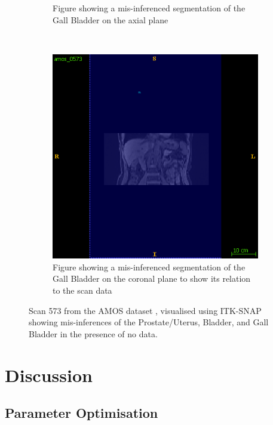 \documentclass{l4proj}
\begin{document}
\begin{figure}[htb]
\begin{subfigure}[b]{0.45\textwidth}
        \caption{Figure showing a mis-inferenced segmentation of the Gall Bladder on the axial plane}
        \label{fig:additional_mis_inference_ghost_2}
    \end{subfigure}
    ~
    \begin{subfigure}[b]{0.45\textwidth}
        \includegraphics[width=\textwidth]{images/ghost_22.png}
        \caption{Figure showing a mis-inferenced segmentation of the Gall Bladder on the coronal plane to show its relation to the scan data}
        \label{fig:additional_mis_inference_ghost_22}
    \end{subfigure}

    \caption{Scan 573 from the AMOS dataset \citep{ji2022amos}, visualised using ITK-SNAP \citep{itksnap} showing mis-inferences of the Prostate/Uterus, Bladder, and Gall Bladder in the presence of no data.} \label{fig:additional_mis_inference}
\end{figure}

\section{Discussion}

\subsection{Parameter Optimisation}
\end{document}
